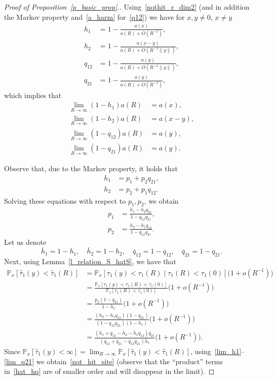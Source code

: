 \documentclass[11pt]{article}
\theoremstyle{definition}
\numberwithin{equation}{section}
\numberwithin{figure}{section}
\numberwithin{table}{section}
\newcommand{\1}[1]{{\mathbf 1}{\{#1\}}}
\newcommand{\8}{{\infty}}
\newcommand{\hh}{{\bar h}}
\newcommand{\hq}{{\bar q}}
\newcommand{\IP}{{\mathbb P}}
\newcommand{\htau}{\widehat{\tau}}
\begin{document}
\begin{proof}[Proof of Proposition~\ref{p_basic_prop}.]
Using~\eqref{nothit_r_dim2} (and in addition the Markov property and~\eqref{a_harm} for~\eqref{q12}) we have for $x,y \neq 0$, $x \neq y$
\begin{align}
h_1&=1-\frac{a(x)}{a(R)+O(R^{-1})},\label{h1}
\\
h_2&=1-\frac{a(x-y)}{a(R)+O(R^{-1}\|y\|)},\label{h2}
\\
q_{12}&=1-\frac{a(y)}{a(R)+O(R^{-1}\|y\|)},\label{q12}
\\
q_{21}&=1-\frac{a(y)}{a(R)+O(R^{-1})},\label{q21}
\end{align}
which implies that
\begin{align}
\lim_{R\to\infty} (1-h_1)a(R)&=a(x),\label{lim_h1}
\\
\lim_{R\to\infty} (1-h_2)a(R)&=a(x-y),\label{lim_h2}
\\
\lim_{R\to\infty} (1-q_{12})a(R) &= a(y),\label{lim_q12}
\\
\lim_{R\to\infty} (1-q_{21})a(R) &=a(y).\label{lim_q21}
\end{align}

Observe that, due to the Markov property, it holds that
\begin{align*}
h_1 &= p_1 + p_2q_{21},\\
h_2 &= p_2 + p_1q_{12}.
\end{align*}
Solving these equations with respect to $p_1,p_2$, we obtain
\begin{align}
p_1 &= \frac{h_1-h_2q_{21}}{1-q_{12}q_{21}},\label{expr_p1}
\\
p_2 &= \frac{h_2-h_1q_{12}}{1-q_{12}q_{21}}.\label{expr_p2}
\end{align}
Let us denote
\begin{equation}\label{bar_all}
\hh_1=1-h_1, \quad \hh_2=1-h_2,\quad
\hq_{12}=1-q_{12},\quad \hq_{21}=1-q_{21}.
\end{equation}
Next, using
Lemma~\ref{l_relation_S_hatS}, we have that
\begin{align}
\IP_x[\htau_1(y)<\htau_1(R)] &= \IP_x[\tau_1(y)<\tau_1(R)\mid \tau_1(R)<\tau_1(0)]
\big(1+o(R^{-1})\big)\nonumber\\
&=\frac{\IP_x[\tau_1(y)<\tau_1(R)<\tau_1(0)]}{\IP_x[\tau_1(R)<\tau_1(0)]}
\big(1+o(R^{-1})\big)\nonumber\\
&=\frac{p_2(1-q_{21})}{1-h_1} \big(1+o(R^{-1})\big)\nonumber\\
&= \frac{(h_2-h_1q_{12})(1-q_{21})}{(1-q_{12}q_{21})(1-h_1)}
\big(1+o(R^{-1})\big)\nonumber\\
&= \frac{(\hh_1+\hq_{12}-\hh_2-\hh_1\hq_{12})\hq_{21}} {(\hq_{12}+\hq_{21}-\hq_{12}\hq_{21})\hh_1} \big(1+o(R^{-1})\big).\label{hat_hq}
\end{align}
Since $\IP_x[\htau_1(y)<\infty]=\lim_{R\to\infty}
\IP_x[\htau_1(y)<\htau_1(R)]$, using~\eqref{lim_h1}--\eqref{lim_q21} we obtain~\eqref{not_hit_site} (observe that the ``product'' terms in~\eqref{hat_hq} are of smaller order and will disappear in the limit).
\end{proof}
\end{document}
